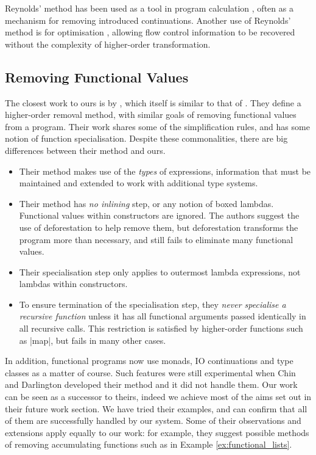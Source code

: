 \documentclass[preprint]{sigplanconf}
\begin{document}
Reynolds' method has been used as a tool in program calculation \cite{danvy:defunctionalization_at_work,hutton:calculating_an_exceptional_machine}, often as a mechanism for removing introduced continuations. Another use of Reynolds' method is for optimisation \cite{jhc}, allowing flow control information to be recovered without the complexity of higher-order transformation.

\subsection{Removing Functional Values}

The closest work to ours is by \citet{chin:higher_order_removal}, which itself is similar to that of \citet{nelan:firstification}. They define a higher-order removal method, with similar goals of removing functional values from a program. Their work shares some of the simplification rules, and has some notion of function specialisation. Despite these commonalities, there are big differences between their method and ours.

\begin{itemize}
\item Their method makes use of the \textit{types} of expressions, information that must be maintained and extended to work with additional type systems.
\item Their method has \textit{no inlining} step, or any notion of boxed lambdas. Functional values within constructors are ignored. The authors suggest the use of deforestation \cite{wadler:deforestation} to help remove them, but deforestation transforms the program more than necessary, and still fails to eliminate many functional values.
\item Their specialisation step only applies to outermost lambda expressions, not lambdas within constructors.
\item To ensure termination of the specialisation step, they \textit{never specialise a recursive function} unless it has all functional arguments passed identically in all recursive calls. This restriction is satisfied by higher-order functions such as |map|, but fails in many other cases.
\end{itemize}

In addition, functional programs now use monads, IO continuations and type classes as a matter of course. Such features were still experimental when Chin and Darlington developed their method and it did not handle them. Our work can be seen as a successor to theirs, indeed we achieve most of the aims set out in their future work section. We have tried their examples, and can confirm that all of them are successfully handled by our system. Some of their observations and extensions apply equally to our work: for example, they suggest possible methods of removing accumulating functions such as in Example \ref{ex:functional_lists}.
\end{document}
